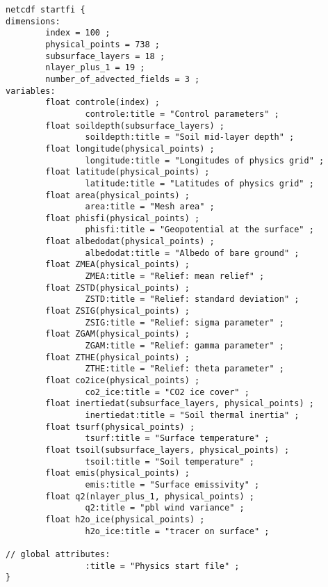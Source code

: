 {\footnotesize
\begin{verbatim}
netcdf startfi {
dimensions:
        index = 100 ;
        physical_points = 738 ;
        subsurface_layers = 18 ;
        nlayer_plus_1 = 19 ;
        number_of_advected_fields = 3 ;
variables:
        float controle(index) ;
                controle:title = "Control parameters" ;
        float soildepth(subsurface_layers) ;
                soildepth:title = "Soil mid-layer depth" ;
        float longitude(physical_points) ;
                longitude:title = "Longitudes of physics grid" ;
        float latitude(physical_points) ;
                latitude:title = "Latitudes of physics grid" ;
        float area(physical_points) ;
                area:title = "Mesh area" ;
        float phisfi(physical_points) ;
                phisfi:title = "Geopotential at the surface" ;
        float albedodat(physical_points) ;
                albedodat:title = "Albedo of bare ground" ;
        float ZMEA(physical_points) ;
                ZMEA:title = "Relief: mean relief" ;
        float ZSTD(physical_points) ;
                ZSTD:title = "Relief: standard deviation" ;
        float ZSIG(physical_points) ;
                ZSIG:title = "Relief: sigma parameter" ;
        float ZGAM(physical_points) ;
                ZGAM:title = "Relief: gamma parameter" ;
        float ZTHE(physical_points) ;
                ZTHE:title = "Relief: theta parameter" ;
        float co2ice(physical_points) ;
                co2_ice:title = "CO2 ice cover" ;
        float inertiedat(subsurface_layers, physical_points) ;
                inertiedat:title = "Soil thermal inertia" ;
        float tsurf(physical_points) ;
                tsurf:title = "Surface temperature" ;
        float tsoil(subsurface_layers, physical_points) ;
                tsoil:title = "Soil temperature" ;
        float emis(physical_points) ;
                emis:title = "Surface emissivity" ;
        float q2(nlayer_plus_1, physical_points) ;
                q2:title = "pbl wind variance" ;
        float h2o_ice(physical_points) ;
                h2o_ice:title = "tracer on surface" ;

// global attributes:
                :title = "Physics start file" ;
}
\end{verbatim}
}
